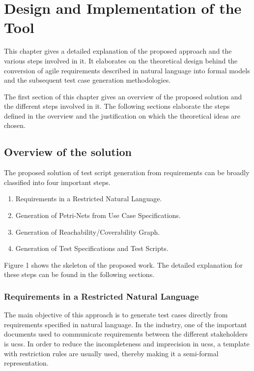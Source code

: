 \chapter{Design and Implementation of the Tool} \label{implementation} 
This chapter gives a detailed explanation of the proposed approach and the various steps involved in it. It elaborates on the theoretical design behind the conversion of agile requirements described in natural language into formal models and the subsequent test case generation methodologies.
 
The first section of this chapter gives an overview of the proposed solution and the different steps involved in it. The following sections elaborate the steps defined in the overview and the justification on which the theoretical ideas are chosen.


\section{Overview of the solution}
The proposed solution of test script generation from requirements can be broadly classified into four important steps.
\begin{enumerate}
\item Requirements in a Restricted Natural Language.
\item Generation of Petri-Nets from Use Case Specifications.
\item Generation of Reachability/Coverability Graph.
\item Generation of Test Specifications and Test Scripts.
\end{enumerate}
Figure 1 shows the skeleton of the proposed work. The detailed explanation for these steps can be found in the following sections. 


\subsection{Requirements in a Restricted Natural Language}
The main objective of this approach is to generate test cases directly from requirements specified in natural language. In the industry, one of the important documents used to communicate requirements between the different stakeholders is \glspl{ucs}. In order to reduce the incompleteness and imprecision in \glspl{ucs}, a template with restriction rules are usually used, thereby making it a semi-formal representation. 

